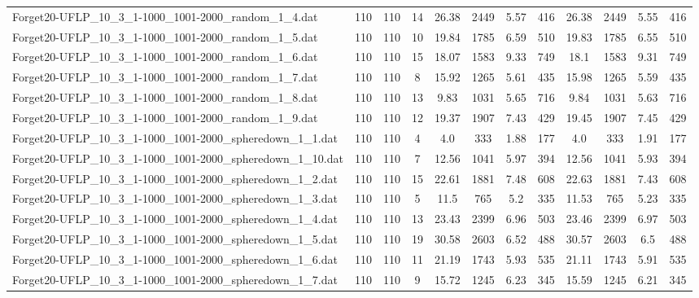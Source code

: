 \begin{sidewaystable}[!ht]
{\begin{tabular}{lccccccccccc}
Forget20-UFLP\_10\_3\_1-1000\_1001-2000\_random\_1\_4.dat & 110 & 110 & 14 & 26.38 & 2449 & 5.57 & 416 & 26.38 & 2449 &  \textcolor{blue2}{5.55} & 416 \\
Forget20-UFLP\_10\_3\_1-1000\_1001-2000\_random\_1\_5.dat & 110 & 110 & 10 & 19.84 & 1785 & 6.59 & 510 & 19.83 & 1785 &  \textcolor{blue2}{6.55} & 510 \\
Forget20-UFLP\_10\_3\_1-1000\_1001-2000\_random\_1\_6.dat & 110 & 110 & 15 & 18.07 & 1583 & 9.33 & 749 & 18.1 & 1583 &  \textcolor{blue2}{9.31} & 749 \\
Forget20-UFLP\_10\_3\_1-1000\_1001-2000\_random\_1\_7.dat & 110 & 110 & 8 & 15.92 & 1265 & 5.61 & 435 & 15.98 & 1265 &  \textcolor{blue2}{5.59} & 435 \\
Forget20-UFLP\_10\_3\_1-1000\_1001-2000\_random\_1\_8.dat & 110 & 110 & 13 & 9.83 & 1031 & 5.65 & 716 & 9.84 & 1031 &  \textcolor{blue2}{5.63} & 716 \\
Forget20-UFLP\_10\_3\_1-1000\_1001-2000\_random\_1\_9.dat & 110 & 110 & 12 & 19.37 & 1907 &  \textcolor{blue2}{7.43} & 429 & 19.45 & 1907 & 7.45 & 429 \\
Forget20-UFLP\_10\_3\_1-1000\_1001-2000\_spheredown\_1\_1.dat & 110 & 110 & 4 & 4.0 & 333 &  \textcolor{blue2}{1.88} & 177 & 4.0 & 333 & 1.91 & 177 \\
Forget20-UFLP\_10\_3\_1-1000\_1001-2000\_spheredown\_1\_10.dat & 110 & 110 & 7 & 12.56 & 1041 & 5.97 & 394 & 12.56 & 1041 &  \textcolor{blue2}{5.93} & 394 \\
Forget20-UFLP\_10\_3\_1-1000\_1001-2000\_spheredown\_1\_2.dat & 110 & 110 & 15 & 22.61 & 1881 & 7.48 & 608 & 22.63 & 1881 &  \textcolor{blue2}{7.43} & 608 \\
Forget20-UFLP\_10\_3\_1-1000\_1001-2000\_spheredown\_1\_3.dat & 110 & 110 & 5 & 11.5 & 765 &  \textcolor{blue2}{5.2} & 335 & 11.53 & 765 & 5.23 & 335 \\
Forget20-UFLP\_10\_3\_1-1000\_1001-2000\_spheredown\_1\_4.dat & 110 & 110 & 13 & 23.43 & 2399 &  \textcolor{blue2}{6.96} & 503 & 23.46 & 2399 & 6.97 & 503 \\
Forget20-UFLP\_10\_3\_1-1000\_1001-2000\_spheredown\_1\_5.dat & 110 & 110 & 19 & 30.58 & 2603 & 6.52 & 488 & 30.57 & 2603 &  \textcolor{blue2}{6.5} & 488 \\
Forget20-UFLP\_10\_3\_1-1000\_1001-2000\_spheredown\_1\_6.dat & 110 & 110 & 11 & 21.19 & 1743 & 5.93 & 535 & 21.11 & 1743 &  \textcolor{blue2}{5.91} & 535 \\
Forget20-UFLP\_10\_3\_1-1000\_1001-2000\_spheredown\_1\_7.dat & 110 & 110 & 9 & 15.72 & 1245 & 6.23 & 345 & 15.59 & 1245 &  \textcolor{blue2}{6.21} & 345 \\

\end{tabular}}
\end{sidewaystable}
